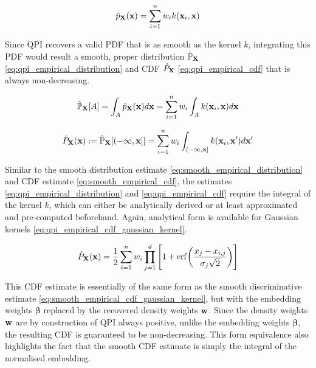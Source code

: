 \documentclass[twoside]{article} \usepackage{aistats2017}
\theoremstyle{definition}
\newcommand{\rv}[1]{{#1}}
\newcommand{\qpi}{QPI }
\begin{document}
	\begin{equation}
		\hat{p}_{\bvec{\rv{X}}}(\bvec{x}) = \sum_{i = 1}^{n} w_{i} k(\bvec{x}_{i}, \bvec{x})
	\label{eq:qpi}
	\end{equation}

	Since \qpi recovers a valid PDF that is as smooth as the kernel $k$, integrating this PDF would result a smooth, proper distribution $\hat{\mathbb{P}}_{\bvec{\rv{X}}}$ \eqref{eq:qpi_empirical_distribution} and CDF $\hat{P}_{\bvec{\rv{X}}}$ \eqref{eq:qpi_empirical_cdf} that is always non-decreasing.
	
	\begin{equation}
		\hat{\mathbb{P}}_{\bvec{\rv{X}}}[A] = \int_{A} \hat{p}_{\bvec{\rv{X}}}(\bvec{x}) d\bvec{x} = \sum_{i = 1}^{n} w_{i} \int_{A} k(\bvec{x}_{i}, \bvec{x}) d\bvec{x}
	\label{eq:qpi_empirical_distribution}
	\end{equation}
	
	\begin{equation}
		\hat{P}_{\bvec{\rv{X}}}(\bvec{x}) := \hat{\mathbb{P}}_{\bvec{\rv{X}}}[(-\bvec{\infty}, \bvec{x}]] = \sum_{i = 1}^{n} w_{i} \int_{(-\bvec{\infty}, \bvec{x}]} k(\bvec{x}_{i}, \bvec{x}') d\bvec{x}'
	\label{eq:qpi_empirical_cdf}
	\end{equation}
	
	Similar to the smooth distribution estimate \eqref{eq:smooth_empirical_distribution} and CDF estimate \eqref{eq:smooth_empirical_cdf}, the estimates \eqref{eq:qpi_empirical_distribution} and \eqref{eq:qpi_empirical_cdf} require the integral of the kernel $k$, which can either be analytically derived or at least approximated and pre-computed beforehand. Again, analytical form is available for Gaussian kernels \eqref{eq:qpi_empirical_cdf_gaussian_kernel}.
	
	\begin{equation}
		\hat{P}_{\bvec{\rv{X}}}(\bvec{x}) = \frac{1}{2} \sum_{i = 1}^{n} w_{i} \prod_{j = 1}^{d} \Bigg[1 + \mathrm{erf}\bigg(\frac{x_{j} - x_{i, j}}{\sigma_{j} \sqrt{2}}\bigg)\Bigg]
	\label{eq:qpi_empirical_cdf_gaussian_kernel}
	\end{equation}
	
	This CDF estimate is essentially of the same form as the smooth discriminative estimate \eqref{eq:smooth_empirical_cdf_gaussian_kernel}, but with the embedding weights $\bm{\beta}$ replaced by the recovered density weights $\mathbf{w}$. Since the density weights $\mathbf{w}$ are by construction of \qpi always positive, unlike the embedding weights $\bm{\beta}$, the resulting CDF is guaranteed to be non-decreasing. This form equivalence also highlights the fact that the smooth CDF estimate is simply the integral of the normalised embedding.
	
\end{document}
